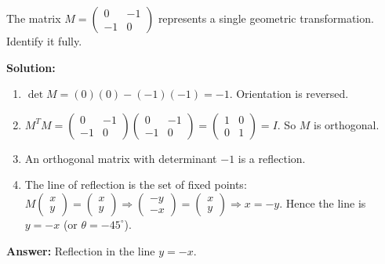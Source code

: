 \documentclass[11pt]{article}
\begin{document}
\begin{exoresolu}
The matrix $M = \begin{pmatrix} 0 & -1 \\ -1 & 0 \end{pmatrix}$ represents a single geometric transformation. Identify it fully.
\par
\tcblower
\textbf{Solution:}
\begin{enumerate}
\item $\det M = (0)(0) - (-1)(-1) = -1$. Orientation is reversed.
\item $M^T M = \begin{pmatrix} 0 & -1 \\ -1 & 0 \end{pmatrix}\begin{pmatrix} 0 & -1 \\ -1 & 0 \end{pmatrix} = \begin{pmatrix} 1 & 0 \\ 0 & 1 \end{pmatrix} = I$. So $M$ is orthogonal.
\item An orthogonal matrix with determinant $-1$ is a reflection.
\item The line of reflection is the set of fixed points: $M\begin{pmatrix} x \\ y \end{pmatrix} = \begin{pmatrix} x \\ y \end{pmatrix} \Rightarrow \begin{pmatrix} -y \\ -x \end{pmatrix} = \begin{pmatrix} x \\ y \end{pmatrix} \Rightarrow x = -y$. Hence the line is $y = -x$ (or $\theta = -45^\circ$).
\end{enumerate}
\textbf{Answer:} Reflection in the line $y = -x$.
\end{exoresolu}
\end{document}

